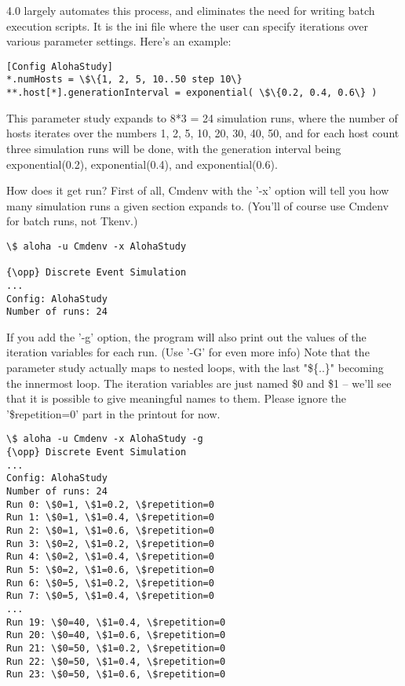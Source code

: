 {\opp} 4.0 largely automates this process, and eliminates the need for
writing batch execution scripts. It is the ini file where the user can
specify iterations over various parameter settings.
Here's an example:

\begin{Verbatim}[commandchars=\\\{\}]
[Config AlohaStudy]
*.numHosts = \$\{1, 2, 5, 10..50 step 10\}
**.host[*].generationInterval = exponential( \$\{0.2, 0.4, 0.6\} )
\end{Verbatim}


This parameter study expands to 8*3 = 24 simulation runs, where the number of
hosts iterates over the numbers 1, 2, 5, 10, 20, 30, 40, 50, and for
each host count three simulation runs will be done, with the generation
interval being exponential(0.2), exponential(0.4), and
exponential(0.6).

How does it get run? First of all, Cmdenv with the '-x' option will tell you how many
simulation runs a given section expands to. (You'll of course use Cmdenv for batch runs,
not Tkenv.)

\begin{Verbatim}[commandchars=\\\{\}]
\$ aloha -u Cmdenv -x AlohaStudy

{\opp} Discrete Event Simulation
...
Config: AlohaStudy
Number of runs: 24
\end{Verbatim}


If you add the '-g' option, the program will also print out the 
values of the iteration variables for each run. (Use '-G' for even more info)
Note that the parameter study actually maps to nested
loops, with the last "\$\{..\}" becoming
the innermost loop. The iteration variables are just named \$0 and \$1
-- we'll see that it is possible to give
meaningful names to them. Please ignore the
'\$repetition=0' part in the printout
for now.


\begin{Verbatim}[commandchars=\\\{\}]
\$ aloha -u Cmdenv -x AlohaStudy -g
{\opp} Discrete Event Simulation
...
Config: AlohaStudy
Number of runs: 24
Run 0: \$0=1, \$1=0.2, \$repetition=0
Run 1: \$0=1, \$1=0.4, \$repetition=0
Run 2: \$0=1, \$1=0.6, \$repetition=0
Run 3: \$0=2, \$1=0.2, \$repetition=0
Run 4: \$0=2, \$1=0.4, \$repetition=0
Run 5: \$0=2, \$1=0.6, \$repetition=0
Run 6: \$0=5, \$1=0.2, \$repetition=0
Run 7: \$0=5, \$1=0.4, \$repetition=0
...
Run 19: \$0=40, \$1=0.4, \$repetition=0
Run 20: \$0=40, \$1=0.6, \$repetition=0
Run 21: \$0=50, \$1=0.2, \$repetition=0
Run 22: \$0=50, \$1=0.4, \$repetition=0
Run 23: \$0=50, \$1=0.6, \$repetition=0
\end{Verbatim}


